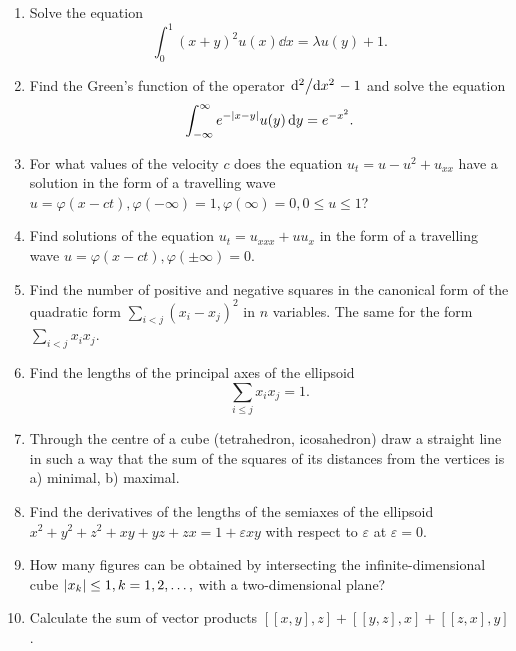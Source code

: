 \documentclass{article}
\begin{document}
\begin{enumerate}
\item Solve the equation
  \begin{equation*}
    \int_0^1(x+y)^2u(x)\dd{x} = \lambda u(y) + 1.
  \end{equation*}

\item Find the Green's function of the operator $\dv*[2]{x} -1$ and solve the equation
  \begin{equation*}
    \int_{-\infty}^\infty e^{-\abs{x-y}}u(y)\dd{y} = e^{-x^2}.
  \end{equation*}

\item For what values of the velocity $c$ does the equation $u_t = u - u^2 + u_{xx}$ have a solution in the form of a travelling wave $u = \varphi(x-ct), \varphi(-\infty) = 1, \varphi(\infty) = 0, 0 \leqslant u \leqslant 1$?

\item Find solutions of the equation $u_t = u_{xxx} + uu_x$ in the form of a travelling wave $u = \varphi(x-ct), \varphi(\pm\infty) = 0$.

\item Find the number of positive and negative squares in the canonical form of the quadratic form $\sum_{i < j} (x_i - x_j)^2$ in $n$ variables. The same for the form $\sum_{i < j} x_i x_j$.

\item Find the lengths of the principal axes of the ellipsoid
  \begin{equation*}
    \sum_{i \leq j} x_i x_j = 1 .
  \end{equation*}

\item Through the centre of a cube (tetrahedron, icosahedron) draw a straight line in such a way that the sum of the squares of its distances from the vertices is a) minimal, b) maximal.

\item Find the derivatives of the lengths of the semiaxes of the ellipsoid $x^2 + y^2 + z^2 + xy + yz + zx = 1 + \varepsilon xy$ with respect to $\varepsilon$ at $\varepsilon = 0$.

\item How many figures can be obtained by intersecting the infinite-dimensional cube $\abs{x_k} \leq 1, k = 1, 2, \dots,$ with a two-dimensional plane?

\item Calculate the sum of vector products $[[x, y], z] + [[y, z], x] + [[z, x], y]$.


\end{enumerate}
\end{document}
